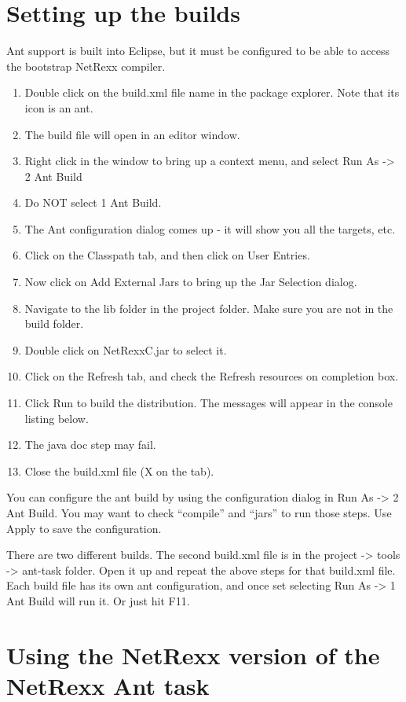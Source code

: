 \section{Setting up the builds}
 
Ant support is built into Eclipse, but it must be configured to be
able to access the bootstrap NetRexx compiler.
\begin{enumerate}
\item Double click on the build.xml file name in the package explorer.
   Note that its icon is an ant.
\item The build file will open in an editor window.
\item Right click in the window to bring up a context menu, and select
   Run As -> 2 Ant Build
\item Do NOT select 1 Ant Build.
\item The Ant configuration dialog comes up - it will show you all the
   targets, etc.
\item Click on the Classpath tab, and then click on User Entries.
\item Now click on Add External Jars to bring up the Jar Selection
   dialog.
\item Navigate to the lib folder in the project folder.  Make sure you
   are not in the build folder.
\item Double click on NetRexxC.jar to select it.
\item Click on the Refresh tab, and check the Refresh resources on
   completion box.
\item Click Run to build the distribution.  The messages will appear in
   the console listing below.
\item The java doc step may fail.
\item Close the build.xml file (X on the tab).
\end{enumerate}
You can configure the ant build by using the configuration dialog in
Run As -> 2 Ant Build.  You may want to check ``compile'' and ``jars''
to run those steps.  Use Apply to save the configuration.
 
There are two different builds.  The second build.xml file is in the
project -> tools -> ant-task folder.
Open it up and repeat the above steps for that build.xml file.  Each
build file has its own ant configuration, and once set selecting Run
As -> 1 Ant Build will run it.  Or just hit F11.
 
\section{Using the NetRexx version of the NetRexx Ant task}
 
